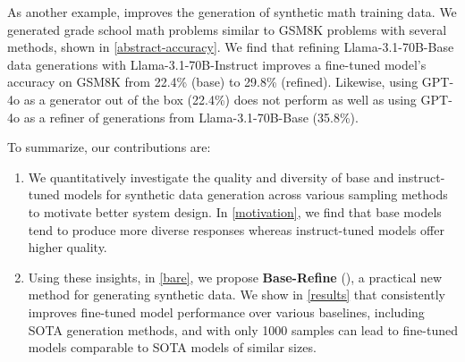 As another example, \Sys{} improves the generation of synthetic math training data. We generated grade school math problems similar to GSM8K problems with several methods, shown in \cref{abstract-accuracy}. We find that refining Llama-3.1-70B-Base data generations with Llama-3.1-70B-Instruct improves a fine-tuned model's accuracy on GSM8K from 22.4\% (base) to 29.8\% (refined). Likewise, using GPT-4o as a generator out of the box (22.4\%) does not perform as well as using GPT-4o as a refiner of generations from Llama-3.1-70B-Base (35.8\%).

To summarize, our contributions are:
\begin{enumerate}
    \item We quantitatively investigate the quality and diversity of base and instruct-tuned models for synthetic data generation across various sampling methods to motivate better system design. In \cref{motivation}, we find that base models tend to produce more diverse responses whereas instruct-tuned models offer higher quality.
    \item Using these insights, in \cref{bare}, we propose \textbf{Base-Refine} (\Sys{}), a practical new method for generating synthetic data. We show in \cref{results} that \Sys{} consistently improves fine-tuned model performance over various baselines, including SOTA generation methods, and with only 1000 samples can lead to fine-tuned models comparable to SOTA models of similar sizes.
\end{enumerate}
